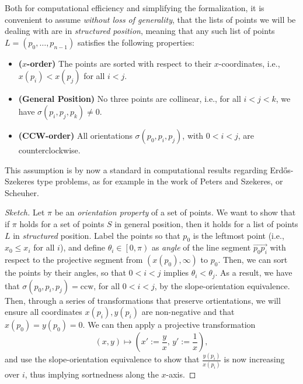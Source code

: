 Both for computational efficiency and simplifying the formalization, it is convenient to assume \emph{without loss of generality}, that the lists of points we will be dealing with are in \emph{structured position}, meaning that any such list of points $L = (p_0,\ldots, p_{n-1})$ satisfies the following properties:
\begin{itemize}
    \item \textbf{($x$-order)} The points are sorted with respect to their $x$-coordinates, i.e., $x(p_i) < x(p_j)$ for all $i < j$.
    \item \textbf{(General Position)} No three points are collinear, i.e., for all $i < j < k$, we have $\sigma(p_i, p_j, p_k) \neq 0$.
    \item \textbf{(CCW-order)} All orientations $\sigma(p_0, p_i, p_j)$, with $0 < i < j$, are counterclockwise.
\end{itemize}
    This assumption is by now a standard in computational results regarding Erd\H{o}s-Szekeres type problems, as for example in the work of Peters and Szekeres, or Scheuher.

\begin{proof}[Sketch]
Let $\pi$ be an \emph{orientation property} of a set of points. We want to show that if $\pi$ holds for a set of points $S$ in general position, then it holds for a list of points $L$ in \emph{structured} position.
Label the points so that $p_0$ is the leftmost point (i.e., $x_0 \leq x_i$ for all $i$), and define $\theta_i \in \left[0, \pi\right)$ as \emph{angle} of the line segment $\vec{p_0p_i}$ with respect to the projective segment from $(x(p_0), \infty)$ to $p_0$.
Then, we can sort the points by their angles, so that $0 < i < j$ implies $\theta_i < \theta_j$.
As a result, we have that $\sigma(p_0, p_i, p_j) = \text{ccw}$, for all $0 < i < j$, by the slope-orientation equivalence. Then, through a series of transformations that preserve ortientations, we will ensure all coordinates $x(p_i), y(p_i)$ are non-negative and that $x(p_0) = y(p_0) = 0$. We can then apply a projective transformation
\[
    (x, y) \mapsto \left(x' := \frac{y}{x}, \, y' := \frac{1}{x}\right),
\]
and use the slope-orientation equivalence to show that  $\frac{y(p_i)}{x(p_i)}$ is now increasing over $i$, thus implying sortnedness along the $x$-axis.

\end{proof}


